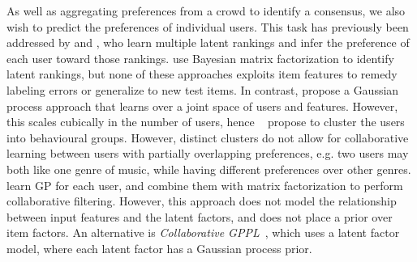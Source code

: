 As well as aggregating preferences from a crowd to identify a consensus,
we also wish to predict the preferences of individual users.
This task has previously been addressed by \citet{yi_inferring_2013} and \citet{kim2014latent},
who learn multiple latent rankings and infer 
the preference of each user toward those rankings.
\citet{salimans2012collaborative} use Bayesian matrix factorization to identify
latent rankings,
but none of these approaches exploits item features to remedy labeling errors or generalize to new test items.
In contrast, \citet{guo2010gaussian} propose a Gaussian process approach that learns over a 
joint space of users and features. However, this scales cubically
in the number of users, hence ~\citet{abbasnejad2013learning} 
propose to cluster the users into behavioural groups.
However, distinct clusters do not
allow for collaborative learning between users with partially overlapping preferences, e.g. two users may both like one genre of music, 
while having different preferences over other genres. 
\citet{khan2014scalable} learn GP for each user,
and combine them with matrix factorization to perform collaborative filtering.
However, this approach does not model the relationship between
 input features and the latent factors, and does not place a prior over item factors.
An alternative is \emph{Collaborative GPPL}~\citep{houlsby2012collaborative},
which uses a latent factor model, where each latent factor has a Gaussian process prior. 
